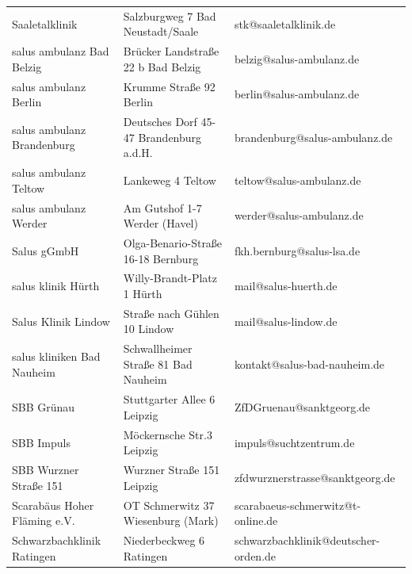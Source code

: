 {\begin{xltabular}{\textwidth} {
 >{\raggedright\arraybackslash}p{5cm}
 >{\raggedright\arraybackslash}X
 >{\raggedright\arraybackslash}p{5cm} }
Saaletalklinik & Salzburgweg 7 Bad Neustadt/Saale & stk@saaletalklinik.de \\
salus ambulanz Bad Belzig & Brücker Landstraße 22 b Bad Belzig & belzig@salus-ambulanz.de \\
salus ambulanz Berlin & Krumme Straße 92 Berlin & berlin@salus-ambulanz.de \\
salus ambulanz Brandenburg & Deutsches Dorf 45-47 Brandenburg a.d.H. & brandenburg@salus-ambulanz.de \\
salus ambulanz Teltow & Lankeweg 4 Teltow & teltow@salus-ambulanz.de \\
salus ambulanz Werder & Am Gutshof 1-7 Werder (Havel) & werder@salus-ambulanz.de \\
Salus gGmbH & Olga-Benario-Straße 16-18 Bernburg & fkh.bernburg@salus-lsa.de \\
salus klinik Hürth & Willy-Brandt-Platz 1 Hürth & mail@salus-huerth.de \\
Salus Klinik Lindow & Straße nach Gühlen 10 Lindow & mail@salus-lindow.de \\
salus kliniken Bad Nauheim & Schwallheimer Straße 81 Bad Nauheim & kontakt@salus-bad-nauheim.de \\
SBB Grünau & Stuttgarter Allee 6 Leipzig & ZfDGruenau@sanktgeorg.de \\
SBB Impuls & Möckernsche Str.3 Leipzig & impuls@suchtzentrum.de \\
SBB Wurzner Straße 151 & Wurzner Straße 151 Leipzig & zfdwurznerstrasse@sanktgeorg.de \\
Scarabäus Hoher Fläming e.V. & OT Schmerwitz 37 Wiesenburg (Mark) & scarabaeus-schmerwitz@t-online.de \\
Schwarzbachklinik Ratingen & Niederbeckweg 6 Ratingen & schwarzbachklinik@deutscher-orden.de \\

\end{xltabular}}
